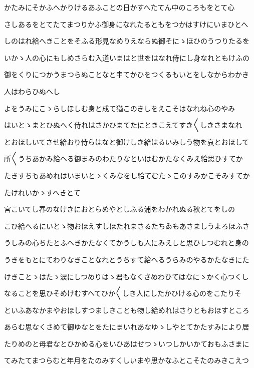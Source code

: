 \documentclass[a4paper,11pt,landscape]{ltjtarticle}
\begin{document}
かたみにそかふへかりけるあふことの日かすへたてん中のころもをとて心
\par\medskip
さしあるをとてたてまつりかふ御身になれたるともをつかはすけにいまひとへ
\par\medskip
しのはれ給へきことをそふる形見なめりえならぬ御そにゝほひのうつりたるを
\par\medskip
いかゝ人の心にもしめさらむ入道いまはと世をはなれ侍にし身なれともけふの
\par\medskip
御をくりにつかうまつらぬことなと申てかひをつくるもいとをしなからわかき
\par\medskip
人はわらひぬへし
\par\medskip
よをうみにこゝらしほしむ身と成て猶このきしをえこそはなれね心のやみ
\par\medskip
はいとゝまとひぬへく侍れはさかひまてたにときこえてすき〱しきさまなれ
\par\medskip
とおほしいてさせ給おり侍らはなと御けしき給はるいみしう物を哀とおほして
\par\medskip
所〱うちあかみ給へる御まみのわたりなといはむかたなくみえ給思ひすてか
\par\medskip
たきすちもあめれはいまいとゝくみなをし給てむたゝこのすみかこそみすてか
\par\medskip
たけれいかゝすへきとて
\par\medskip
宮こいてし春のなけきにおとらめやとしふる浦をわかれぬる秋とてをしの
\par\medskip
こひ給へるにいとゝ物おほえすしほたれまさるたちゐもあさましうよろほふさ
\par\medskip
うしみの心ちたとふへきかたなくてかうしも人にみえしと思ひしつむれと身の
\par\medskip
うきをもとにてわりなきことなれとうちすて給へるうらみのやるかたなきにた
\par\medskip
けきことゝはたゝ涙にしつめりはゝ君もなくさめわひてはなにゝかく心つくし
\par\medskip
なることを思ひそめけむすへてひか〱しき人にしたかひける心のをこたりそ
\par\medskip
といふあなかまやおほしすつましきことも物し給めれはさりともおほすところ
\par\medskip
あらむ思なくさめて御ゆなとをたにまいれあなゆゝしやとてかたすみにより居
\par\medskip
たりめのと母君なとひかめる心をいひあはせつゝいつしかいかておもふさまに
\par\medskip
てみたてまつらむと年月をたのみすくしいまや思かなふとこそたのみきこえつ
\par\medskip
\end{document}
